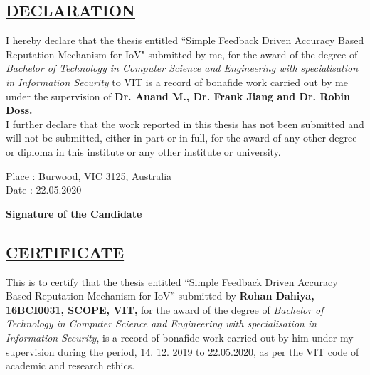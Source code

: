 \documentclass[12pt,a4paper]{article}
\begin{document}
\newpage
\begin{center}
\section*{\textbf{\underline{DECLARATION}}}
\end{center}
\vspace{1 cm}
I hereby declare that the thesis entitled “Simple Feedback Driven Accuracy Based Reputation Mechanism for IoV" submitted by me, for the award of the degree of \textit{Bachelor of Technology in Computer Science and Engineering with specialisation in Information Security} to VIT is a record of bonafide work carried out by me under the supervision of \textbf{Dr. Anand M., Dr. Frank Jiang and Dr. Robin Doss.}\\ 

I further declare that the work reported in this thesis has not been submitted and will not be submitted, either in part or in full, for the award of any other degree or diploma in this institute or any other institute or university.

\noindent \begin{minipage}{0.45\linewidth}
\begin{flushleft}
\vspace{5 cm}
                         
Place  : Burwood, VIC 3125, Australia\\
Date  : 22.05.2020\\
\end{flushleft} 
\end{minipage}
\hfill
\begin{minipage}{0.45\linewidth}
\begin{flushright}                                      
\vspace{9cm}
                   
\textbf{Signature of the Candidate}\\
\end{flushright} 
\end{minipage}

\thispagestyle{empty}

\newpage
\begin{center}
\section*{\textbf{\underline{CERTIFICATE}}}
\end{center}
\vspace{1 cm}
This is to certify that the thesis entitled “Simple Feedback Driven Accuracy Based Reputation Mechanism for IoV” submitted by \textbf{Rohan Dahiya, 16BCI0031, SCOPE, VIT,} for the award of the degree of \textit{Bachelor of Technology in Computer Science and Engineering with specialisation in Information Security}, is a record of bonafide work carried out by him under my supervision during the period, 14. 12. 2019 to 22.05.2020, as per the VIT code of academic and research ethics.\\
\end{document}
